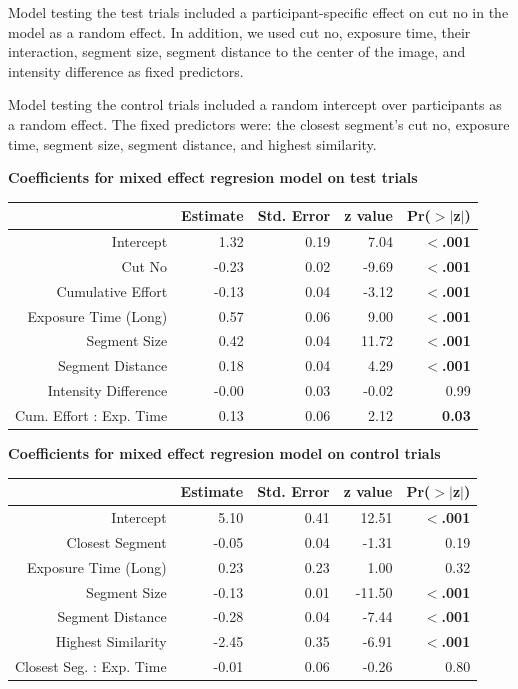 \documentclass{article}
\begin{document}
Model testing the test trials included a participant-specific effect on cut no in the model as a random effect. In addition, we used cut no, exposure time, their interaction, segment size, segment distance to the center of the image, and intensity difference as fixed predictors.

Model testing the control trials included a random intercept over participants as a random effect. The fixed predictors were: the closest segment's cut no, exposure time, segment size, segment distance, and highest similarity. 

\clearpage

\label{mixedEff_Test}
\textbf{Coefficients for mixed effect regresion model on test trials}

\begin{table}[ht]
\centering
\begin{tabular}{rrrrr}
  \hline
 & Estimate & Std. Error & z value & Pr($>$$|$z$|$) \\ 
  \hline
  Intercept & 1.32 & 0.19 & 7.04 & \textbf{$<$.001} \\ 
  Cut No & -0.23 & 0.02 & -9.69 & \textbf{$<$.001} \\ 
  Cumulative Effort & -0.13 & 0.04 & -3.12 & \textbf{$<$.001}\\ 
  Exposure Time (Long) & 0.57 & 0.06 & 9.00 & \textbf{$<$.001} \\ 
  Segment Size & 0.42 & 0.04 & 11.72 & \textbf{$<$.001} \\ 
  Segment Distance & 0.18 & 0.04 & 4.29 & \textbf{$<$.001} \\ 
  Intensity Difference & -0.00 & 0.03 & -0.02 & 0.99 \\ 
  Cum. Effort : Exp. Time & 0.13 & 0.06 & 2.12 & \textbf{0.03} \\ 
   \hline
\end{tabular}
\end{table}

\label{mixedEff_Cntrl}
\textbf{Coefficients for mixed effect regresion model on control trials}

\begin{table}[ht]
\centering
\begin{tabular}{rrrrr}
  \hline
 & Estimate & Std. Error & z value & Pr($>$$|$z$|$) \\ 
  \hline
  Intercept & 5.10 & 0.41 & 12.51 & \textbf{$<$.001}  \\ 
  Closest Segment & -0.05 & 0.04 & -1.31 & 0.19 \\ 
  Exposure Time (Long) & 0.23 & 0.23 & 1.00 & 0.32 \\ 
  Segment Size & -0.13 & 0.01 & -11.50 & \textbf{$<$.001}  \\ 
  Segment Distance & -0.28 & 0.04 & -7.44 & \textbf{$<$.001}  \\ 
  Highest Similarity & -2.45 & 0.35 & -6.91 & \textbf{$<$.001}  \\ 
  Closest Seg. : Exp. Time & -0.01 & 0.06 & -0.26 & 0.80 \\ 
   \hline
\end{tabular}
\end{table}
\end{document}
